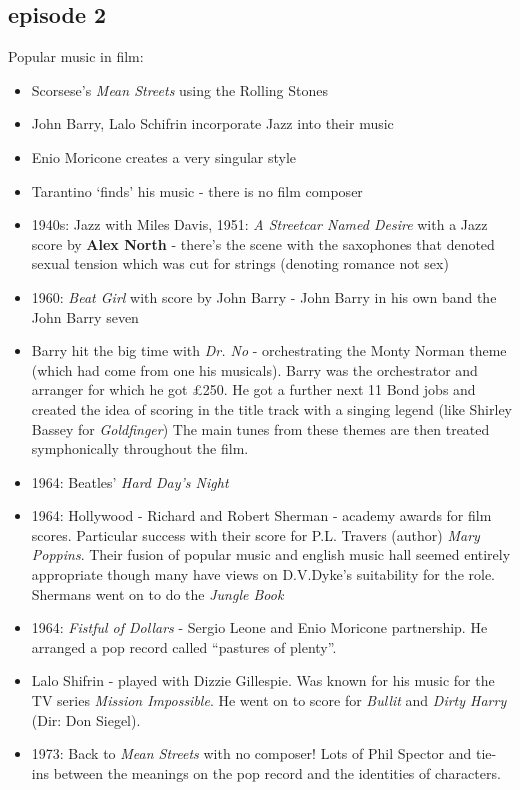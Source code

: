 \subsection{episode 2}
Popular music in film:
\begin{itemize}
\item Scorsese's \textit{Mean Streets} using the Rolling Stones
\item John Barry, Lalo Schifrin incorporate Jazz into their music 
\item Enio Moricone creates a very singular style
\item Tarantino `finds' his music - there is no film composer
\item 1940s: Jazz with Miles Davis, 1951: \textit{A Streetcar Named Desire} with a Jazz score by \textbf{Alex North} - there's the scene with the saxophones that denoted sexual tension which was cut for strings (denoting romance not sex)
\item 1960: \textit{Beat Girl} with score by John Barry - John Barry in his own band the John Barry seven
\item Barry hit the big time with \textit{Dr. No} - orchestrating the Monty Norman theme (which had come from one his musicals). Barry was the orchestrator and arranger for which he got £250. He got a further next 11 Bond jobs and created the idea of scoring in the title track with a singing legend (like Shirley Bassey for \textit{Goldfinger}) The main tunes from these themes are then treated symphonically throughout the film.
\item 1964: Beatles' \textit{Hard Day's Night}
\item 1964: Hollywood - Richard and Robert Sherman - academy awards for film scores. Particular success with their score for P.L. Travers (author) \textit{Mary Poppins}. Their fusion of popular music and english music hall seemed entirely appropriate though many have views on D.V.Dyke's suitability for the role. Shermans went on to do the \textit{Jungle Book}
\item 1964: \textit{Fistful of Dollars} - Sergio Leone and Enio Moricone partnership. He arranged a pop record called ``pastures of plenty''. 
\item Lalo Shifrin - played with Dizzie Gillespie. Was known for his music for the TV series \textit{Mission Impossible}. He went on to score for \textit{Bullit} and \textit{Dirty Harry} (Dir: Don Siegel). 
\item 1973: Back to \textit{Mean Streets} with no composer! Lots of Phil Spector and tie-ins between the meanings on the pop record and the identities of characters.

\end{itemize}

